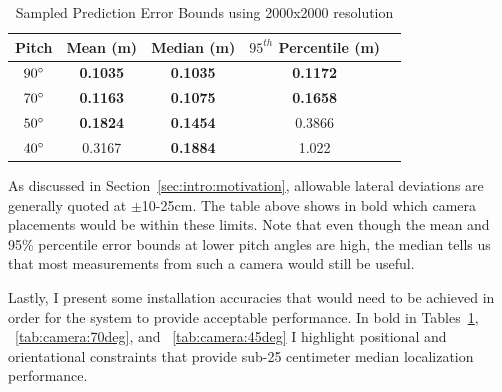 \documentclass[a4paper,12pt,twoside,openright]{report}
\begin{document}
\begin{table}[htb]
    \centering
    \caption{Sampled Prediction Error Bounds using 2000x2000 resolution}
    \label{tab:camera:best error bounds}
    \begin{tabular}{@{}ccccc@{}}
        \toprule 
        \textbf{Pitch}       & \textbf{Mean (m)}   & \textbf{Median (m)} & \textbf{$95^{th}$ Percentile (m)} &  \\ \midrule 
        $90\degree$ & \textbf{0.1035} & \textbf{0.1035} & \textbf{0.1172}           &  \\ 
        $70\degree$ & \textbf{0.1163} & \textbf{0.1075} & \textbf{0.1658}           &  \\
        $50\degree$ & \textbf{0.1824} & \textbf{0.1454} & 0.3866           &  \\
        $40\degree$ & 0.3167 & \textbf{0.1884} & 1.022            &  \\ \midrule
    \end{tabular}
\end{table}


As discussed in Section~\ref{sec:intro:motivation}, allowable lateral deviations are generally
quoted at $\pm$10-25cm. The table above shows in bold which camera placements would be 
within these limits. Note that even though the mean and 95\% percentile error bounds
at lower pitch angles are high, the median tells us that most measurements
from such a camera would still be useful.

Lastly, I present some installation accuracies that would need to be achieved
in order for the system to provide acceptable performance. In bold in 
Tables~\ref{tab:camera:best error bounds}, ~\ref{tab:camera:70deg}, and
~\ref{tab:camera:45deg} I highlight positional and orientational 
constraints that provide sub-25 centimeter median localization performance.
\end{document}
